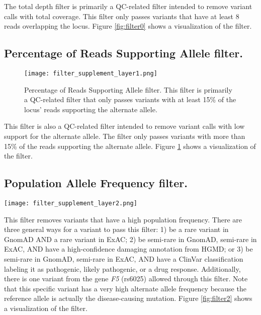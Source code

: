 \documentclass{article}
\begin{document}
The total depth filter is primarily a QC-related filter intended to remove variant calls with total coverage.  This filter only passes variants that have at least 8 reads overlapping the locus.  Figure \ref{fig:filter0} shows a visualization of the filter.

\subsection{Percentage of Reads Supporting Allele filter.}

\begin{figure}
\centering
\texttt{[image: filter\_supplement\_layer1.png]}
\caption{Percentage of Reads Supporting Allele filter.  This filter is primarily a QC-related filter that only passes variants with at least 15\% of the locus' reads supporting the alternate allele.}
\label{fig:filter1}
\end{figure}

This filter is also a QC-related filter intended to remove variant calls with low support for the alternate allele.  The filter only passes variants with more than 15\% of the reads supporting the alternate allele.  Figure \ref{fig:filter1} shows a visualization of the filter.

\subsection{Population Allele Frequency filter.}

\begin{sidewaysfigure}
\centering
\texttt{[image: filter\_supplement\_layer2.png]}
\caption{Population Allele Frequency filter.  This filter is primarily designed to filter out variants with a high population frequency.  It relies mostly on GnomAD and ExAC to determine allele frequencies.  Variants that are only semi-rare are allowed through if there are appropriate HGMD or ClinVar annotations supporting them.  Additionally, one variant in gene {\it F5} (rs6025) is allowed through because the reference allele is actually the rare, pathogenic allele.}
\label{fig:filter2}
\end{sidewaysfigure}

This filter removes variants that have a high population frequency.  There are three general ways for a variant to pass this filter: 1) be a rare variant in GnomAD AND a rare variant in ExAC; 2) be semi-rare in GnomAD, semi-rare in ExAC, AND have a high-confidence damaging annotation from HGMD; or 3) be semi-rare in GnomAD, semi-rare in ExAC, AND have a ClinVar classification labeling it as pathogenic, likely pathogenic, or a drug response.  Additionally, there is one variant from the gene {\it F5} (rs6025) allowed through this filter.  Note that this specific variant has a very high alternate allele frequency because the reference allele is actually the disease-causing mutation.  Figure \ref{fig:filter2} shows a visualization of the filter.
\end{document}
